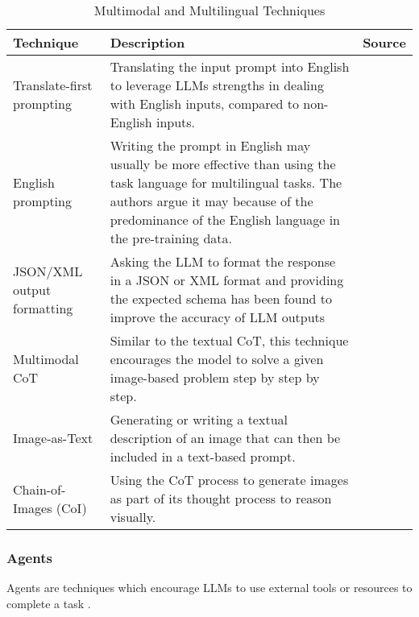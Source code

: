 \begin{table}[h!]
    \centering
    \begin{tabular}{p{3cm} p{8cm} p{2cm}}
        \toprule
        \textbf{Technique} & \textbf{Description} & \textbf{Source} \\
        \midrule
        \raggedright
        Translate-first prompting & Translating the input prompt into English to leverage LLMs strengths in dealing with English inputs, compared to non-English inputs. & \textcite{translate-first} \\
        \hline
        \raggedright
        English prompting & Writing the prompt in English may usually be more effective than using the task language for multilingual tasks. The authors argue it may because of the predominance of the English language in the pre-training data. & \textcite{english-prompting} \\
        \hline
        \raggedright
        JSON/XML output formatting & Asking the LLM to format the response in a JSON or XML format and providing the expected schema has been found to improve the accuracy of LLM outputs  & \textcite{jsonllm} \\
        \hline
        \raggedright
        Multimodal CoT & Similar to the textual CoT, this technique encourages the model to solve a given image-based problem step by step by step. & \textcite{multimodal-cot} \\
        \hline
        \raggedright
        Image-as-Text & Generating or writing a textual description of an image that can then be included in a text-based prompt. & \textcite{images-as-text} \\
        \hline
        \raggedright
        Chain-of-Images (CoI) & Using the CoT process to generate images as part of its thought process to reason visually. & \textcite{coi} \\
        \bottomrule
    \end{tabular}
    \caption{Multimodal and Multilingual Techniques}\label{tab:multi_prompt}
\end{table}

\FloatBarrier{}

\subsubsection{Agents}

Agents are techniques which encourage LLMs to use external tools or resources to complete a task \parencite{prompt1}.

